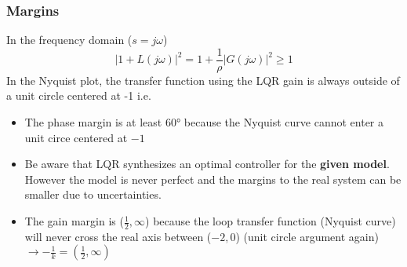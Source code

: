 \subsubsection{Margins}
In the frequency domain ($s=j\omega$)
\noindent\begin{equation*}
    \left|1+L(j\omega)\right|^2=1+\frac1\rho\left|G(j\omega)\right|^2\geq1
\end{equation*}
In the Nyquist plot, the transfer function using the LQR gain is always outside of a unit circle centered at -1 i.e.
\begin{itemize}
    \item The phase margin is at least 60° because the Nyquist curve cannot enter a unit circe centered at $-1$ %
    \item Be aware that LQR synthesizes an optimal controller for the \textbf{given model}. However the model is never perfect and the margins to the real system can be smaller due to uncertainties.
    \item The gain margin is ($\frac{1}{2},\infty$) because the loop transfer function (Nyquist curve) will never cross the real axis between ($-2, 0$) (unit circle argument again)\newline $\to -\frac{1}{k} = (\frac{1}{2}, \infty)$
\end{itemize}

